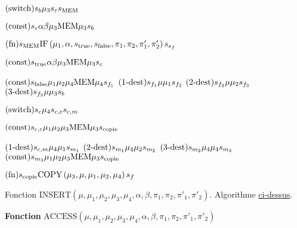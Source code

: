 \begin{appendices}
\begin{algorithm}[H]
			\espace
			
			
			$\text{(switch)} s_{b} \mu_3 s_{\varepsilon} s_{\text{MEM}}$ \;
			
			\espace
			
			$\text{(const)} s_{\varepsilon} \alpha \beta \mu_3 \text{MEM} \mu_3 s_{b}$ \;
			
			\espace
			
			$\text{(fn)} s_{\text{MEM}} \text{IF}\left( \mu_1, \alpha, s_{\text{true}}, s_{\text{false}}, \pi_1, \pi_2, \pi'_1, \pi'_2 \right) s_{s_f} $\;
			
			$\text{(const)} s_{\text{true}} \alpha \beta \mu_3 \text{MEM} \mu_3 s_{c}$ \;
			
			\espace 
			
			$\text{(const)} s_{\text{false}} \mu_1 \mu_2 \mu_4 \text{MEM} \mu_4 s_{f_1}$ \;
			$\text{($1$-dest)} s_{f_1} \mu \mu_1 s_{f_2}$ \;
			$\text{($2$-dest)} s_{f_2} \mu \mu_2 s_{f_3}$ \;
			$\text{($3$-dest)} s_{f_3} \mu \mu_3 s_{b}$ \;
			
			\espace 
			
			
			$\text{(switch)} s_{c} \mu_4 s_{c,\varepsilon} s_{c, m}$ \;
			
			\espace
			
			$\text{(const)} s_{c, \varepsilon} \mu_1 \mu_2 \mu_3 \text{MEM} \mu_3 s_{\text{copie}}$ \;
			
			
			$\text{($1$-dest)} s_{c,m} \mu_4 \mu_1 s_{m_1}$ \;
			$\text{($2$-dest)} s_{m_1} \mu_4 \mu_2 s_{m_2}$ \;
			$\text{($3$-dest)} s_{m_2} \mu_4 \mu_4 s_{m_3}$ \;
			$\text{(const)} s_{m_3} \mu_1 \mu_2 \mu_3 \text{MEM} \mu_3 s_{\text{copie}}$ \;
			
			$\text{(fn)} s_{\text{copie}} \text{COPY}\left( \mu_3, \mu, \mu_1, \mu_2, \mu_4 \right) s_{f}$ \;
			
			\caption{Fonction $\text{INSERT}\left( \mu, \mu_1, \mu_2, \mu_3, \mu_4, \alpha, \beta, \pi_1, \pi_2, \pi'_1, \pi'_2\right)$. Algorithme \hyperref[algo:A_RAM_fn_INSERT]{ci-dessus}.}
		\end{algorithm}
		
		\espace
		
		\begin{algorithm}[H]
			\label{prog:A_RAM_fn_ACCESS}
			
			\textbf{Fonction} $\text{ACCESS}\left( \mu, \mu_1, \mu_2, \mu_3, \mu_4, \alpha, \beta, \pi_1, \pi_2, \pi'_1, \pi'_2\right)$
			

\end{algorithm}
\end{appendices}
